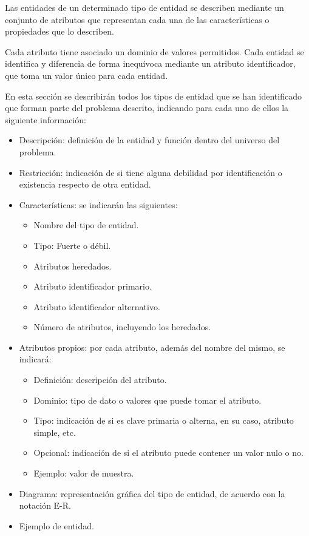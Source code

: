 Las entidades de un determinado tipo de entidad se describen mediante un conjunto de atributos que representan cada una de las características o propiedades que lo describen.

Cada atributo tiene asociado un dominio de valores permitidos. Cada entidad se identifica y diferencia de forma inequívoca mediante un atributo identificador, que toma un valor único para cada entidad.

En esta sección se describirán todos los tipos de entidad que se han identificado que forman parte del problema descrito, indicando para cada uno de ellos la siguiente información:

\begin{itemize}
    \item Descripción: definición de la entidad y función dentro del universo del problema.
    
    \item Restricción: indicación de si tiene alguna debilidad por identificación o existencia respecto de otra entidad.
    
    \item Características: se indicarán las siguientes: 
    \begin{itemize}
        \item Nombre del tipo de entidad.
        \item Tipo: Fuerte o débil.
        \item Atributos heredados.
        \item Atributo identificador primario.
        \item Atributo identificador alternativo.
        \item Número de atributos, incluyendo los heredados.
    \end{itemize}
    
    \item Atributos propios: por cada atributo, además del nombre del mismo, se indicará:
    \begin{itemize}
        \item Definición: descripción del atributo.
        \item Dominio: tipo de dato o valores que puede tomar el atributo.
        \item Tipo: indicación de si es clave primaria o alterna, en su caso, atributo simple, etc.
        \item Opcional: indicación de si el atributo puede contener un valor nulo o no.
        \item Ejemplo: valor de muestra.
    \end{itemize}
    
    \item Diagrama: representación gráfica del tipo de entidad, de acuerdo con la notación E-R.
    
    \item Ejemplo de entidad.
\end{itemize}    

